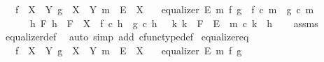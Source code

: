 \begin{isabellebody}
\ \ \ {\isachardoublequoteopen}f\ {\isacharcolon}{\kern0pt}\ X\ {\isasymrightarrow}\ Y{\isachardoublequoteclose}\ {\isachardoublequoteopen}g\ {\isacharcolon}{\kern0pt}\ X\ {\isasymrightarrow}\ Y{\isachardoublequoteclose}\ {\isachardoublequoteopen}m\ {\isacharcolon}{\kern0pt}\ E\ {\isasymrightarrow}\ X{\isachardoublequoteclose}\isanewline
\ \ \ {\isachardoublequoteopen}equalizer\ E\ m\ f\ g\ {\isasymlongleftrightarrow}\ {\isacharparenleft}{\kern0pt}{\isacharparenleft}{\kern0pt}f\ {\isasymcirc}\isactrlsub c\ m\ {\isacharequal}{\kern0pt}\ g\ {\isasymcirc}\isactrlsub c\ m{\isacharparenright}{\kern0pt}\isanewline
\ \ \ \ {\isasymand}\ {\isacharparenleft}{\kern0pt}{\isasymforall}\ h\ F{\isachardot}{\kern0pt}\ {\isacharparenleft}{\kern0pt}{\isacharparenleft}{\kern0pt}h\ {\isacharcolon}{\kern0pt}\ F\ {\isasymrightarrow}\ X{\isacharparenright}{\kern0pt}\ {\isasymand}\ {\isacharparenleft}{\kern0pt}f\ {\isasymcirc}\isactrlsub c\ h\ {\isacharequal}{\kern0pt}\ g\ {\isasymcirc}\isactrlsub c\ h{\isacharparenright}{\kern0pt}{\isacharparenright}{\kern0pt}\ {\isasymlongrightarrow}\ {\isacharparenleft}{\kern0pt}{\isasymexists}{\isacharbang}{\kern0pt}\ k{\isachardot}{\kern0pt}\ {\isacharparenleft}{\kern0pt}k\ {\isacharcolon}{\kern0pt}\ F\ {\isasymrightarrow}\ E{\isacharparenright}{\kern0pt}\ {\isasymand}\ m\ {\isasymcirc}\isactrlsub c\ k\ {\isacharequal}{\kern0pt}\ h{\isacharparenright}{\kern0pt}{\isacharparenright}{\kern0pt}{\isacharparenright}{\kern0pt}{\isachardoublequoteclose}\isanewline
%
\isadelimproof
\ \ %
\endisadelimproof
%
\isatagproof
{}\isamarkupfalse%
\ assms\ \isamarkupfalse%
\ equalizer{\isacharunderscore}{\kern0pt}def\ \isamarkupfalse%
\ {\isacharparenleft}{\kern0pt}auto\ simp\ add{\isacharcolon}{\kern0pt}\ cfunc{\isacharunderscore}{\kern0pt}type{\isacharunderscore}{\kern0pt}def{\isacharparenright}{\kern0pt}%
\endisatagproof
{\isafoldproof}%
%
\isadelimproof
\isanewline
%
\endisadelimproof
\isanewline
{}\isamarkupfalse%
\ equalizer{\isacharunderscore}{\kern0pt}eq{\isacharcolon}{\kern0pt}\isanewline
\ \ \ {\isachardoublequoteopen}f\ {\isacharcolon}{\kern0pt}\ X\ {\isasymrightarrow}\ Y{\isachardoublequoteclose}\ {\isachardoublequoteopen}g\ {\isacharcolon}{\kern0pt}\ X\ {\isasymrightarrow}\ Y{\isachardoublequoteclose}\ {\isachardoublequoteopen}m\ {\isacharcolon}{\kern0pt}\ E\ {\isasymrightarrow}\ X{\isachardoublequoteclose}\isanewline
\ \ \ {\isachardoublequoteopen}equalizer\ E\ m\ f\ g{\isachardoublequoteclose}\isanewline

\end{isabellebody}
